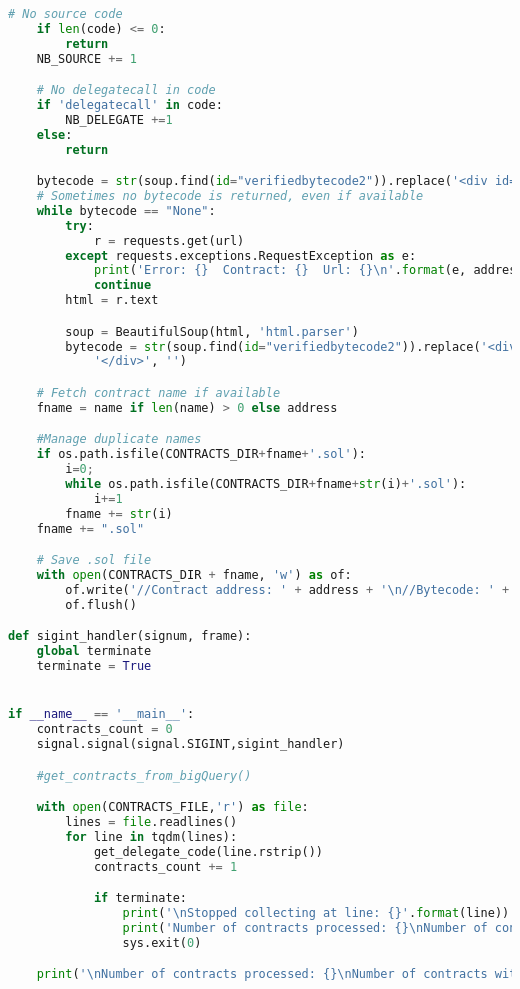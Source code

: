 \begin{lstlisting}[language=Python]
    # No source code
    if len(code) <= 0:
        return
    NB_SOURCE += 1

    # No delegatecall in code
    if 'delegatecall' in code:
        NB_DELEGATE +=1
    else:
        return

    bytecode = str(soup.find(id="verifiedbytecode2")).replace('<div id=\"verifiedbytecode2\">', '').replace('</div>','')
    # Sometimes no bytecode is returned, even if available
    while bytecode == "None":
        try:
            r = requests.get(url)
        except requests.exceptions.RequestException as e:
            print('Error: {}  Contract: {}  Url: {}\n'.format(e, address, url))
            continue
        html = r.text

        soup = BeautifulSoup(html, 'html.parser')
        bytecode = str(soup.find(id="verifiedbytecode2")).replace('<div id=\"verifiedbytecode2\">', '').replace(
            '</div>', '')

    # Fetch contract name if available
    fname = name if len(name) > 0 else address

    #Manage duplicate names
    if os.path.isfile(CONTRACTS_DIR+fname+'.sol'):
        i=0;
        while os.path.isfile(CONTRACTS_DIR+fname+str(i)+'.sol'):
            i+=1
        fname += str(i)
    fname += ".sol"

    # Save .sol file
    with open(CONTRACTS_DIR + fname, 'w') as of:
        of.write('//Contract address: ' + address + '\n//Bytecode: ' + bytecode + '\n' + code)
        of.flush()

def sigint_handler(signum, frame):
    global terminate
    terminate = True


if __name__ == '__main__':
    contracts_count = 0
    signal.signal(signal.SIGINT,sigint_handler)

    #get_contracts_from_bigQuery()

    with open(CONTRACTS_FILE,'r') as file:
        lines = file.readlines()
        for line in tqdm(lines):
            get_delegate_code(line.rstrip())
            contracts_count += 1

            if terminate:
                print('\nStopped collecting at line: {}'.format(line))
                print('Number of contracts processed: {}\nNumber of contracts with source code: {}\nNumber of contracts with delegatecall: {}'.format(contracts_count,NB_SOURCE,NB_DELEGATE))
                sys.exit(0)

    print('\nNumber of contracts processed: {}\nNumber of contracts with source code: {}\nNumber of contracts with delegatecall: {}'.format(contracts_count, NB_SOURCE, NB_DELEGATE))
\end{lstlisting}